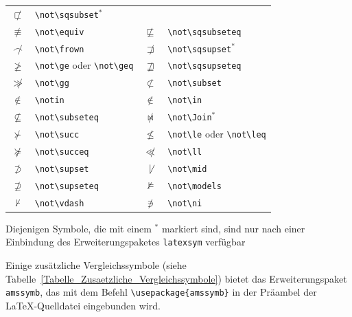 \documentclass[a4paper,10pt,twoside]{scrbook}
\begin{document}
\begin{table}[h!tb]
\begin{tabular}{clcl}
$\not\sqsubset$ & \texttt{\textbackslash not\textbackslash sqsubset$^\ast$} \\
$\not\equiv$ & \texttt{\textbackslash not\textbackslash equiv} &
$\not\sqsubseteq$ & \texttt{\textbackslash not\textbackslash sqsubseteq} \\
$\not\frown$ & \texttt{\textbackslash not\textbackslash frown} & 
$\not\sqsupset$ & \texttt{\textbackslash not\textbackslash sqsupset$^\ast$} \\
$\not\geq$ & \texttt{\textbackslash not\textbackslash ge} oder \texttt{\textbackslash not\textbackslash geq} & 
$\not\sqsupseteq$ & \texttt{\textbackslash not\textbackslash sqsupseteq} \\
$\not\gg$ & \texttt{\textbackslash not\textbackslash gg} & 
$\not\subset$ & \texttt{\textbackslash not\textbackslash subset} \\
$\notin$ & \texttt{\textbackslash notin} &
$\not\in$ & \texttt{\textbackslash not\textbackslash in} \\
$\not\subseteq$ & \texttt{\textbackslash not\textbackslash subseteq} &
$\not\Join$ & \texttt{\textbackslash not\textbackslash Join$^\ast$} \\
$\not\succ$ & \texttt{\textbackslash not\textbackslash succ} &
$\not\le$ & \texttt{\textbackslash not\textbackslash le} oder \texttt{\textbackslash not\textbackslash leq} \\
$\not\succeq$ & \texttt{\textbackslash not\textbackslash succeq} &
$\not\ll$ & \texttt{\textbackslash not\textbackslash ll} \\
$\not\supset$ & \texttt{\textbackslash not\textbackslash supset} &
$\not\mid$ & \texttt{\textbackslash not\textbackslash mid} \\
$\not\supseteq$ & \texttt{\textbackslash not\textbackslash supseteq} &
$\not\models$ & \texttt{\textbackslash not\textbackslash models} \\
$\not\vdash$ & \texttt{\textbackslash not\textbackslash vdash} &
$\not\ni$ & \texttt{\textbackslash not\textbackslash ni} \\
\hline
\end{tabular}
\end{table}

Diejenigen Symbole, die mit einem $^\ast$ markiert sind, sind nur nach einer
Einbindung des Erweiterungspaketes \texttt{latexsym} verfügbar

Einige zusätzliche Vergleichssymbole (siehe Tabelle~\ref{Tabelle_Zusaetzliche_Vergleichssymbole}) 
bietet das Erweiterungspaket \verb!amssymb!, 
das mit dem Befehl \verb!\usepackage{amssymb}! in der Präambel der \LaTeX-Quelldatei eingebunden wird.
\end{document}
